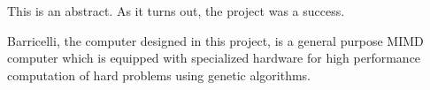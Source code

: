 This is an abstract.
As it turns out, the project was a success.

Barricelli, the computer designed in this project, is a general purpose MIMD computer which is equipped with specialized hardware for high performance computation of hard problems using genetic algorithms.
